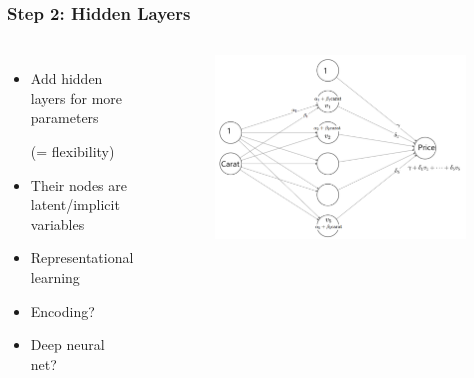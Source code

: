 \begin{frame}
	\frametitle{Step 2: Hidden Layers}
	\begin{columns}
		\begin{itemize}
			\item Add \alert{hidden layers} for more parameters 
			
			(= flexibility)
			\item Their nodes are latent/implicit variables
			\item Representational learning
			\item \small{\alert{Encoding}?}
			\item \small{\alert{Deep} neural net?}
		\end{itemize}
		\begin{example}
		\end{example}
		\begin{figure}
			\includegraphics[width=0.98\textwidth]{../figs/nn_1_hidden.png}
		\end{figure}
	\end{columns}
\end{frame}

